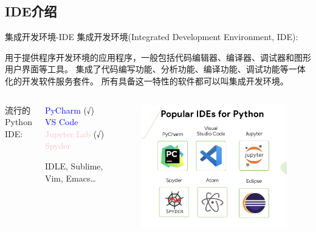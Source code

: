 \subsection{IDE介绍}
\begin{frame}{集成开发环境-IDE}
    集成开发环境(Integrated Development Environment, IDE): 

    \tiny{用于提供程序开发环境的应用程序，一般包括代码编辑器、编译器、调试器和图形用户界面等工具。
    集成了代码编写功能、分析功能、编译功能、调试功能等一体化的开发软件服务套件。
    所有具备这一特性的软件都可以叫集成开发环境。
    }

    \normalsize
    \begin{columns}

        流行的 Python IDE:

        \begin{myoutline}
            \1 \textcolor{blue}{PyCharm} (√)
            \1 \textcolor{blue}{VS Code}
            \1 \textcolor{pink}{Jupyter Lab} (√)
            \1 \textcolor{pink}{Spyder}

            \tiny{\1 IDLE, Sublime, Vim, Emacs\dots}
        \end{myoutline}

        
        \begin{figure}
            \centering
            \includegraphics[width=0.7\linewidth]{Images/IDEs.jpg}
        \end{figure}
    \end{columns}

\end{frame}



